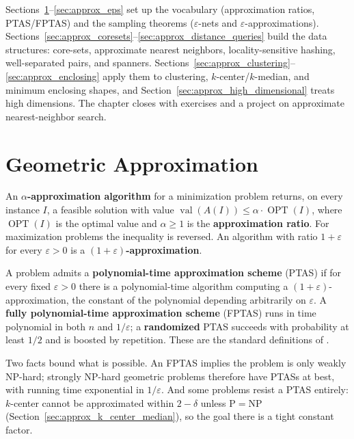 Sections~\ref{sec:approx_intro}--\ref{sec:approx_eps} set up the vocabulary
(approximation ratios, PTAS/FPTAS) and the sampling theorems
($\varepsilon$-nets and $\varepsilon$-approximations).
Sections~\ref{sec:approx_coresets}--\ref{sec:approx_distance_queries}
build the data structures: core-sets, approximate nearest neighbors,
locality-sensitive hashing, well-separated pairs, and spanners.
Sections~\ref{sec:approx_clustering}--\ref{sec:approx_enclosing} apply them
to clustering, $k$-center/$k$-median, and minimum enclosing shapes, and
Section~\ref{sec:approx_high_dimensional} treats high dimensions. The
chapter closes with exercises and a project on approximate nearest-neighbor
search.


\section{Geometric Approximation}
\label{sec:approx_intro}

\begin{definition}\label{def:approx_ratio}
  An \textbf{$\alpha$-approximation algorithm} for a minimization problem
  returns, on every instance $I$, a feasible solution with value
  $\operatorname{val}(A(I)) \leq \alpha \cdot \operatorname{OPT}(I)$, where
  $\operatorname{OPT}(I)$ is the optimal value and $\alpha \geq 1$ is the
  \textbf{approximation ratio}. For
  maximization problems the inequality is reversed. An algorithm with ratio
  $1 + \varepsilon$ for every $\varepsilon > 0$ is a
  \textbf{$(1+\varepsilon)$-approximation}.
\end{definition}

\begin{definition}\label{def:approx_ptas}
  A problem admits a \textbf{polynomial-time approximation scheme} (PTAS)
  if for every fixed $\varepsilon > 0$ there is a polynomial-time algorithm
  computing a $(1 + \varepsilon)$-approximation, the constant of the
  polynomial depending arbitrarily on $\varepsilon$. A \textbf{fully
  polynomial-time approximation scheme} (FPTAS) runs in time polynomial in
  both $n$ and $1/\varepsilon$; a \textbf{randomized} PTAS succeeds with
  probability at least $1/2$ and is boosted by repetition. These are the
  standard definitions of \cite{cormen2009}.
\end{definition}

Two facts bound what is possible. An FPTAS implies the problem is only
weakly NP-hard; strongly NP-hard geometric problems therefore have PTASs at
best, with running time exponential in $1/\varepsilon$. And some problems
resist a PTAS entirely: $k$-center cannot be approximated within
$2 - \delta$ unless $\mathrm{P} = \mathrm{NP}$ (Section~\ref{sec:approx_k_center_median}),
so the goal there is a tight constant factor.

